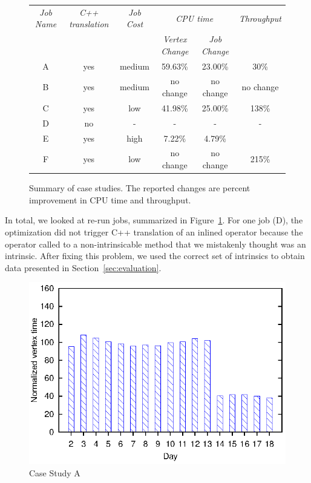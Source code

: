 \begin{figure}[ht]
\begin{tabular}{c|c|c|c|c|c} 
\toprule
  {\em Job Name} & {\em C++ translation}&{\em Job Cost} & \multicolumn{2}{c}{\em CPU time} &  {\em Throughput } \\
  \cmidrule{4-5}  
  & & & {\em Vertex Change} & {\em Job Change} &  \\
  \midrule

A & yes & medium & 59.63\%  & 23.00\% & 30\%\\
B &yes & medium & no change & no change & no change\\
C & yes & low    & 41.98\%  & 25.00\% & 138\% \\
D & no & - & - & - & -\\
E & yes & high   & 7.22\%   & 4.79\% &  \\
F & yes & low & no change & no change & 215\%\\

\end{tabular}
\caption{Summary of case studies. The reported changes are percent improvement in CPU time and throughput. \label{fig:caseStudySummary}}
\end{figure}

In total, we looked at \casestudyjobs{} re-run jobs, summarized in Figure~\ref{fig:caseStudySummary}. 
For one job (D), the optimization did not trigger C++ translation of an inlined operator because the operator called to a non-intrinsicable method that we mistakenly thought was an intrinsic.
After fixing this problem, we used the correct set of intrinsics to obtain data presented in Section~\ref{sec:evaluation}.
\begin{figure}[ht]
\includegraphics{graphs/normalizedTimesA}
\caption{Case Study A \label{fig:CaseStudyA}}
\end{figure}

